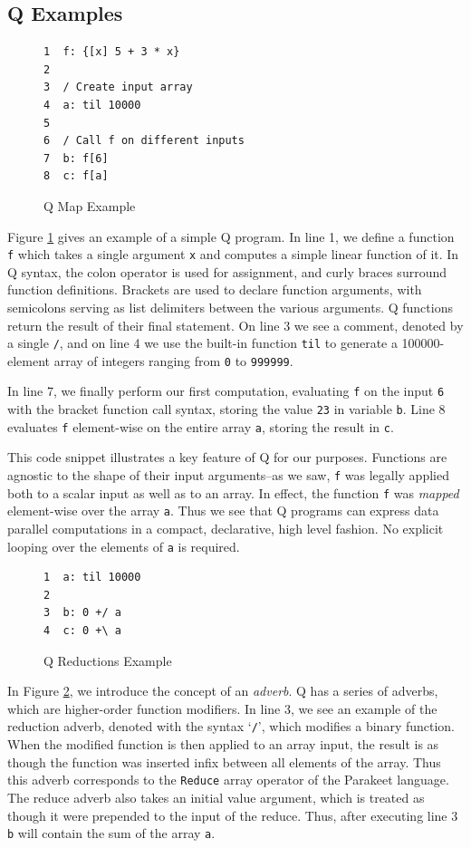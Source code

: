 \documentclass[preprint]{sigplanconf}
\begin{document}
\subsection{Q Examples}
\begin{figure}
\begin{verbatim}
1  f: {[x] 5 + 3 * x}
2
3  / Create input array
4  a: til 10000
5
6  / Call f on different inputs
7  b: f[6]
8  c: f[a]
\end{verbatim}
\caption{Q Map Example}
\label{QMap}
\end{figure}

Figure \ref{QMap} gives an example of a simple Q program.  In line 1, we define
a function \texttt{f} which takes a single argument \texttt{x} and computes a
simple linear function of it.  In Q syntax, the colon operator is used for
assignment, and curly braces surround function definitions.  Brackets are used
to declare function arguments, with semicolons serving as list delimiters
between the various arguments.  Q functions return the result of their final
statement.  On line 3 we see a comment, denoted by a single \texttt{/}, and on
line 4 we use the built-in function \texttt{til} to generate a
100000-element array of integers ranging from \texttt{0} to \texttt{999999}.

In line 7, we finally perform our first computation, evaluating \texttt{f} on
the input \texttt{6} with the bracket function call syntax, storing the
value \texttt{23} in variable \texttt{b}.  Line 8 evaluates \texttt{f}
element-wise on the entire array \texttt{a}, storing the result in \texttt{c}.

This code snippet illustrates a key feature of Q for our purposes.  Functions
are agnostic to the shape of their input arguments--as we saw, \texttt{f} was
legally applied both to a scalar input as well as to an array.  In effect, the
function \texttt{f} was {\it mapped} element-wise over the array \texttt{a}.
Thus we see that Q programs can express data parallel computations in a compact,
declarative, high level fashion.  No explicit looping over the elements of
\texttt{a} is required.

\begin{figure}
\begin{verbatim}
1  a: til 10000
2
3  b: 0 +/ a
4  c: 0 +\ a
\end{verbatim}
\caption{Q Reductions Example}
\label{QReduce}
\end{figure}

In Figure \ref{QReduce}, we introduce the concept of an \emph{adverb}.  Q has a
series of adverbs, which are higher-order function modifiers.  In
line 3, we see an example of the reduction adverb, denoted with the syntax
`\texttt{/}', which modifies a binary function. When the modified function is
then applied to an array input, the result is as though the function was
inserted infix between all elements of the array.  Thus this adverb corresponds
to the \texttt{Reduce} array operator of the Parakeet language.  The reduce
adverb also takes an initial value argument, which is treated as though it were
prepended to the input of the reduce.  Thus, after executing line 3 \texttt{b}
will contain the sum of the array \texttt{a}.
\end{document}

